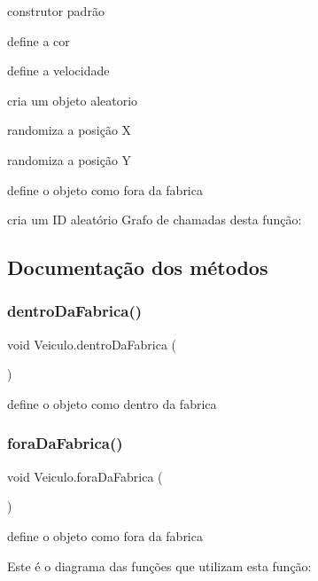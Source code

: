 construtor padrão 

define a cor

define a velocidade

cria um objeto aleatorio

randomiza a posição X

randomiza a posição Y

define o objeto como fora da fabrica

cria um ID aleatório Grafo de chamadas desta função\+:


\subsection{Documentação dos métodos}
\mbox{\label{class_veiculo_a2bb3cf76255e4d6c33531daa82b1dfa7}} 
\subsubsection{\texorpdfstring{dentro\+Da\+Fabrica()}{dentroDaFabrica()}}
{\footnotesize\ttfamily void Veiculo.\+dentro\+Da\+Fabrica (\begin{DoxyParamCaption}{ }\end{DoxyParamCaption})}



define o objeto como dentro da fabrica 

\mbox{\label{class_veiculo_a72e8117111488e80a40e377327c361ea}} 
\subsubsection{\texorpdfstring{fora\+Da\+Fabrica()}{foraDaFabrica()}}
{\footnotesize\ttfamily void Veiculo.\+fora\+Da\+Fabrica (\begin{DoxyParamCaption}{ }\end{DoxyParamCaption})}



define o objeto como fora da fabrica 

Este é o diagrama das funções que utilizam esta função\+:
\mbox{\label{class_veiculo_a6447f0eeb99399f1f96e835c22a88479}} 
